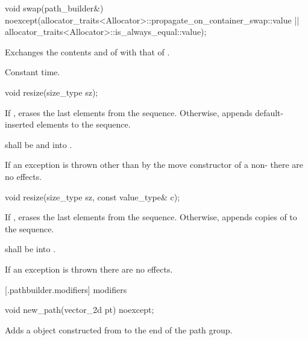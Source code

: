 %
\begin{itemdecl}
void swap(path_builder&)
  noexcept(allocator_traits<Allocator>::propagate_on_container_swap::value ||
  allocator_traits<Allocator>::is_always_equal::value);
\end{itemdecl}
\begin{itemdescr}
\pnum
\effects
Exchanges the contents and
of
with that of .

\pnum
\complexity
Constant time.
\end{itemdescr}

%
\begin{itemdecl}
void resize(size_type sz);
\end{itemdecl}
\begin{itemdescr}
\pnum
\effects
If , erases the last  elements
from the sequence. Otherwise, appends  default-inserted 
elements to the sequence.

\pnum
\requires
{} shall be
 and  into .

\pnum
\remarks
If an exception is thrown other than by the move constructor of a 
non-
 there are no effects.
\end{itemdescr}

%
\begin{itemdecl}
void resize(size_type sz, const value_type& c);
\end{itemdecl}
\begin{itemdescr}
\pnum
\effects
If , erases the last  elements
from the sequence. Otherwise,
appends  copies of  to the sequence.

\pnum
\requires
{} shall be  into .

\pnum
\remarks
If an exception is thrown there are no effects.
\end{itemdescr}

 [\iotwod.pathbuilder.modifiers] { modifiers}

%
\begin{itemdecl}
void new_path(vector_2d pt) noexcept;
\end{itemdecl}
\begin{itemdescr}
\pnum
\effects
Adds a  object constructed from  to the end of the path group.
\end{itemdescr}

